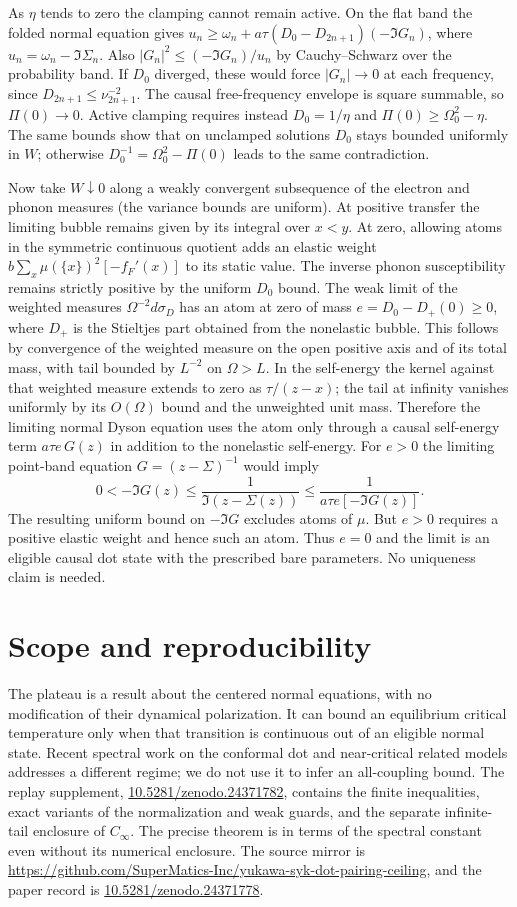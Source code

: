\documentclass[11pt]{article}
\newcommand{\DOTDOI}{\href{https://doi.org/10.5281/zenodo.24371778}{10.5281/zenodo.24371778}}
\newcommand{\DOTSUPPDOI}{\href{https://doi.org/10.5281/zenodo.24371782}{10.5281/zenodo.24371782}}
\newcommand{\DOTREPO}{\url{https://github.com/SuperMatics-Inc/yukawa-syk-dot-pairing-ceiling}}
\begin{document}
As $\eta$ tends to zero the clamping cannot remain active. On the flat band the folded normal equation gives $u_n\ge\omega_n+a\tau(D_0-D_{2n+1})(-\Im G_n)$, where $u_n=\omega_n-\Im\Sigma_n$. Also $|G_n|^2\le(-\Im G_n)/u_n$ by Cauchy--Schwarz over the probability band. If $D_0$ diverged, these would force $|G_n|\to0$ at each frequency, since $D_{2n+1}\le\nu_{2n+1}^{-2}$. The causal free-frequency envelope is square summable, so $\Pi(0)\to0$. Active clamping requires instead $D_0=1/\eta$ and $\Pi(0)\ge\Omega_0^2-\eta$. The same bounds show that on unclamped solutions $D_0$ stays bounded uniformly in $W$; otherwise $D_0^{-1}=\Omega_0^2-\Pi(0)$ leads to the same contradiction.

Now take $W\downarrow0$ along a weakly convergent subsequence of the electron and phonon measures (the variance bounds are uniform). At positive transfer the limiting bubble remains given by its integral over $x<y$. At zero, allowing atoms in the symmetric continuous quotient adds an elastic weight $b\sum_x\mu(\{x\})^2[-f_F'(x)]$ to its static value. The inverse phonon susceptibility remains strictly positive by the uniform $D_0$ bound. The weak limit of the weighted measures $\Omega^{-2}d\sigma_D$ has an atom at zero of mass $e=D_0-D_+(0)\ge0$, where $D_+$ is the Stieltjes part obtained from the nonelastic bubble. This follows by convergence of the weighted measure on the open positive axis and of its total mass, with tail bounded by $L^{-2}$ on $\Omega>L$. In the self-energy the kernel against that weighted measure extends to zero as $\tau/(z-x)$; the tail at infinity vanishes uniformly by its $O(\Omega)$ bound and the unweighted unit mass. Therefore the limiting normal Dyson equation uses the atom only through a causal self-energy term $a\tau e\,G(z)$ in addition to the nonelastic self-energy. For $e>0$ the limiting point-band equation $G=(z-\Sigma)^{-1}$ would imply
\[
 0<-\Im G(z)\le \frac1{\Im(z-\Sigma(z))}
              \le \frac1{a\tau e[-\Im G(z)]}.
\]
The resulting uniform bound on $-\Im G$ excludes atoms of $\mu$. But $e>0$ requires a positive elastic weight and hence such an atom. Thus $e=0$ and the limit is an eligible causal dot state with the prescribed bare parameters. No uniqueness claim is needed.

\section*{Scope and reproducibility}
The plateau is a result about the centered normal equations, with no modification of their dynamical polarization. It can bound an equilibrium critical temperature only when that transition is continuous out of an eligible normal state. Recent spectral work on the conformal dot and near-critical related models \cite{SS,DK} addresses a different regime; we do not use it to infer an all-coupling bound. The replay supplement, \DOTSUPPDOI, contains the finite inequalities, exact variants of the normalization and weak guards, and the separate infinite-tail enclosure of $C_\infty$. The precise theorem is in terms of the spectral constant even without its numerical enclosure. The source mirror is \DOTREPO, and the paper record is \DOTDOI.



\end{document}
